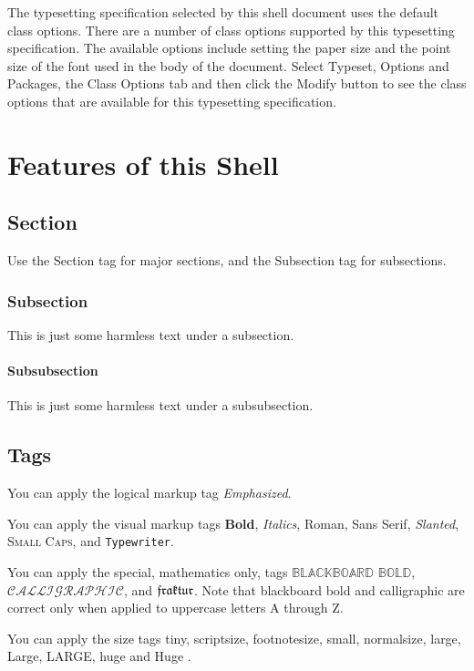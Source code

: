 \documentclass{amsbook}
\theoremstyle{plain}
\numberwithin{equation}{chapter}
\begin{document}
The typesetting specification selected by this shell document uses the
default class options. There are a number of class options supported by this
typesetting specification. The available options include setting the paper
size and the point size of the font used in the body of the document. Select
\textsf{Typeset, Options and Packages}, the \textsf{Class Options} tab and
then click the \textsf{Modify} button to see the class options that are
available for this typesetting specification.

\chapter{Features of this Shell}

\section{Section}

Use the Section tag for major sections, and the Subsection tag for
subsections.

\subsection{Subsection}

This is just some harmless text under a subsection.

\subsubsection{Subsubsection}

This is just some harmless text under a subsubsection.

\section{Tags}

You can apply the logical markup tag \emph{Emphasized}.

You can apply the visual markup tags \textbf{Bold}, \textit{Italics},
\textrm{Roman}, \textsf{Sans Serif}, \textsl{Slanted}, \textsc{Small Caps},
and \texttt{Typewriter}.

You can apply the special, mathematics only, tags $\mathbb{BLACKBOARD}$ $%
\mathbb{BOLD}$, $\mathcal{CALLIGRAPHIC}$, and $\frak{fraktur}$. Note that
blackboard bold and calligraphic are correct only when applied to uppercase
letters A through Z.

You can apply the size tags {\tiny tiny}, {\scriptsize scriptsize},
{\footnotesize footnotesize}, {\small small}, {\normalsize normalsize},
{\large large}, {\Large Large}, {\LARGE LARGE}, {\huge huge} and {\Huge Huge}%
.
\end{document}
